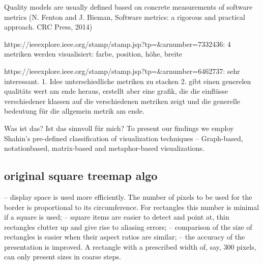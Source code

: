 Quality models are usually defined based on concrete measurements of software metrics (N. Fenton and J. Bieman, Software metrics: a rigorous and practical approach. CRC Press, 2014)

https://ieeexplore.ieee.org/stamp/stamp.jsp?tp=&arnumber=7332436:
4 metriken werden visualisiert: farbe, position, höhe, breite

https://ieeexplore.ieee.org/stamp/stamp.jsp?tp=&arnumber=6462737:
sehr interessant.
1. Idee unterschiedliche metriken zu stacken
2. gibt einen generelen qualitäts wert am ende heraus, erstellt aber eine grafik, die die einflüsse verschiedener klassen auf die verschiedenen metriken zeigt und die generelle bedeutung für die allgemein metrik am ende.


Was ist das? Ist das sinnvoll für mich?
To present our findings
we employ Shahin’s pre-defined classification of
visualization techniques – Graph-based, notationbased, matrix-based and metaphor-based
visualizations. 

\subsection{original square treemap algo}
– display space is used more efficiently. The number of pixels to be used for the border
is proportional to its circumference. For rectangles this number is minimal if a square
is used;
– square items are easier to detect and point at, thin rectangles clutter up and give rise
to aliasing errors;
– comparison of the size of rectangles is easier when their aspect ratios are similar;
– the accuracy of the presentation is improved. A rectangle with a prescribed width of,
say, 300 pixels, can only present sizes in coarse steps.

